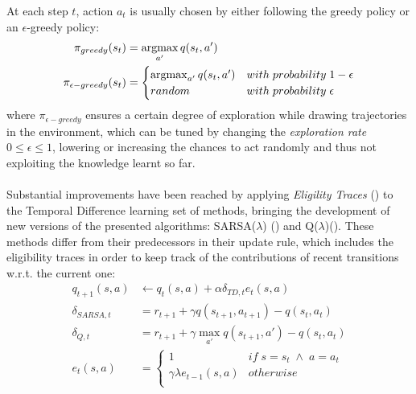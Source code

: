                 At each step $t$, action $a_t$ is usually chosen by either following the greedy policy or an $\epsilon$-greedy policy:
                \begin{align*}
                    \pi_{greedy}(s_t) &= \operatorname*{argmax}_{a'}q(s_t, a')\\
                    \pi_{\epsilon -greedy}(s_t) &= 
                                    \begin{cases} 
                                        \operatorname*{argmax}_{a'}q(s_t, a') & with \; probability \; 1 - \epsilon \\
                                        random & with \; probability \; \epsilon \\ 
                                    \end{cases}
                \end{align*}
                where $\pi_{\epsilon -greedy}$ ensures a certain degree of exploration while drawing trajectories in the environment, which can be tuned by changing the \textit{exploration rate} $0 \leq \epsilon \leq 1$, lowering or increasing the chances to act randomly and thus not exploiting the knowledge learnt so far.
                \\\\
                Substantial improvements have been reached by applying \textit{Eligility Traces} () to the Temporal Difference learning set of methods, bringing the development of new versions of the presented algorithms: SARSA($\lambda$) () and Q($\lambda$)(). These methods differ from their predecessors in their update rule, which includes the eligibility traces in order to keep track of the contributions of recent transitions w.r.t. the current one:
                \begin{align*}
                    q_{t+1}(s, a) &\leftarrow q_{t}(s, a) + \alpha \delta_{TD, t} e_t(s, a)\\
                    \delta_{SARSA, t}    &= r_{t+1} + \gamma q(s_{t+1}, a_{t+1}) - q(s_t, a_t)\\
                    \delta_{Q, t}        &= r_{t+1} + \gamma \max_{a'} q(s_{t+1}, a') - q(s_t, a_t)\\
                    e_{t}(s,a) &= 
                            \begin{cases} 
                                1 & if \; s = s_t \; \wedge \; a = a_t \\
                                \gamma \lambda e_{t-1}(s, a) & otherwise \\ 
                            \end{cases}
                \end{align*}
